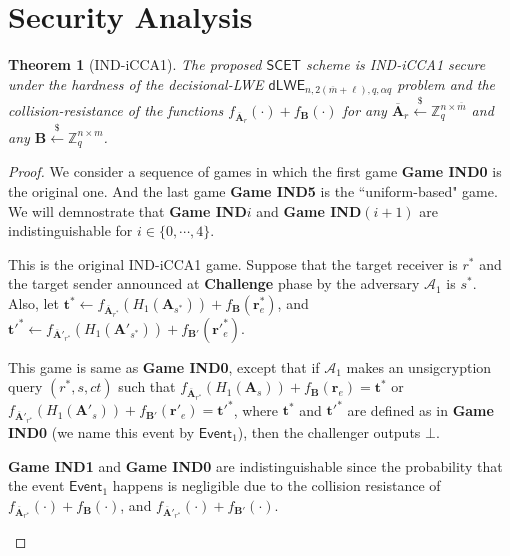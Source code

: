 \documentclass[a4paper,11pt,onecolumn]{elsarticle}
\newtheorem{theorem}{Theorem}
\begin{document}
	
	\section{Security Analysis} \label{security}
	
	\begin{theorem}[IND-iCCA1] \label{indtheorem}
	The proposed $\mathsf{SCET}$ scheme is IND-iCCA1 secure under the hardness of the decisional-LWE $\mathsf{dLWE}_{n,2(\overline{m}+\ell), q,\alpha q}$ problem and the collision-resistance of the functions $ f_{\overline{\textbf{A}}_{r}}(\cdot)+f_{\textbf{B}}(\cdot)$ for any $\overline{\mathbf{A}}_r \xleftarrow{\$} \mathbb{Z}_q^{n \times\overline{ m}}$ and any $\mathbf{B} \xleftarrow{\$} \mathbb{Z}_q^{n \times m}$.
	\end{theorem}
	
	\begin{proof}  We consider a sequence of games in which the first game \textbf{Game IND0} is the original one. And the last game \textbf{Game IND5} is the ``uniform-based" game. We will demnostrate that \textbf{Game IND}$i$ and \textbf{Game IND}$(i+1)$ are indistinguishable for $i\in \{0, \cdots, 4\}$.
		
		\begin{description}
			\item[Game IND0.] This is the original IND-iCCA1  game. Suppose that the target receiver is $r^*$ and the target sender announced at \textbf{Challenge} phase by the adversary $\mathcal{A}_1$ is $s^*$. Also, let  $\textbf{t}^*\gets f_{\overline{\textbf{A}}_{r^*}}(H_1(\textbf{A}_{s^*}))+f_{\textbf{B}}(\textbf{r}^*_e)$, and $\textbf{t}'^*\gets f_{\overline{\textbf{A}}'_{r^*}}(H_1(\textbf{A}'_{s^*}))+f_{\textbf{B}'}(\textbf{r}'^*_e)$.
			 \item[Game IND1.]  This game is same as \textbf{Game IND0}, except that if  $\mathcal{A}_1$ makes an unsigcryption query  $(r^*, s,ct)$ such that $f_{\overline{\textbf{A}}_{r^*}}(H_1(\textbf{A}_s))+f_{\textbf{B}}(\textbf{r}_e)=\textbf{t}^*$ or $f_{\overline{\textbf{A}}'_{r^*}}(H_1(\textbf{A}'_s))+f_{\textbf{B}'}(\textbf{r}'_e)=\textbf{t}'^*$, where $\textbf{t}^*$ and $\textbf{t}'^*$ are defined as in \textbf{Game IND0} (we name this event by $\textsf{Event}_1$), then the challenger outputs $\bot$. 
			\item   \textbf{Game IND1} and \textbf{Game IND0} are indistinguishable since the probability that the event $\textsf{Event}_1$ happens is negligible due to the collision resistance of  $ f_{\overline{\textbf{A}}_{r^*}}(\cdot)+f_{\textbf{B}}(\cdot)$, and $ f_{\overline{\textbf{A}}'_{r^*}}(\cdot)+f_{\textbf{B}'}(\cdot)$. 
	

\end{description}
\end{proof}
\end{document}

